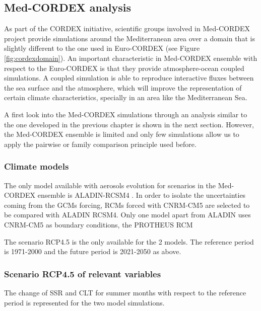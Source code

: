 \begin{subappendices}
\subsection{Med-CORDEX analysis}

As part of the CORDEX initiative, scientific groups involved in Med-CORDEX \cite*{Ruti2016} project provide simulations around the Mediterranean area over a domain that is slightly different to the one used in Euro-CORDEX (see Figure \ref{fig:cordexdomain}). An important characteristic in Med-CORDEX ensemble with respect to the Euro-CORDEX is that they provide atmosphere-ocean coupled simulations. A coupled simulation is able to reproduce interactive fluxes between the sea surface and the atmosphere, which will improve the representation of certain climate characteristics, specially in an area like the Mediterranean Sea.

A first look into the Med-CORDEX simulations through an analysis  similar to the one developed in the previous chapter is shown in the next section. However, the Med-CORDEX ensemble is limited and only few simulations allow us to apply the pairwise or family comparison principle used before.

\subsubsection{Climate models}

The only model available with aerosols evolution for scenarios in the Med-CORDEX ensemble is ALADIN-RCSM4 \cite*{Sevault2014}. In order to isolate the uncertainties coming from the GCMs forcing, RCMs forced with CNRM-CM5 are selected to be compared with ALADIN RCSM4. Only one model apart from ALADIN uses CNRM-CM5 as boundary conditions, the PROTHEUS RCM \cite*{Artale2010}

The scenario RCP4.5 is the only available for the 2 models. The reference period is 1971-2000 and the future period is 2021-2050 as above.

\subsubsection{Scenario RCP4.5 of relevant variables}

The change of SSR and CLT for summer months with respect to the reference period is represented for the two model simulations.


\end{subappendices}
